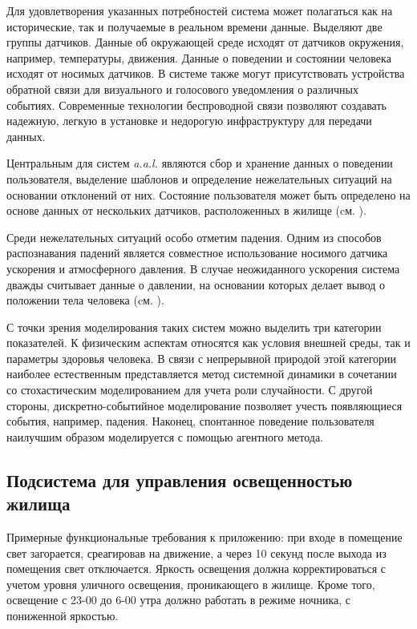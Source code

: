 Для удовлетворения указанных потребностей система может полагаться как на исторические, так и получаемые в реальном времени данные. Выделяют две группы датчиков. Данные об окружающей среде исходят от датчиков окружения, например, температуры, движения. Данные о поведении и состоянии человека исходят от носимых датчиков. В системе также могут присутствовать устройства обратной связи для визуального и голосового уведомления о различных событиях. Современные технологии беспроводной связи позволяют создавать надежную, легкую в установке и недорогую инфраструктуру для передачи данных.

Центральным для систем \textit{a.a.l.} являются сбор и хранение данных о поведении пользователя, выделение шаблонов и определение нежелательных ситуаций на основании отклонений от них. Состояние пользователя может быть определено на основе данных от нескольких датчиков, расположенных в жилище (cм. ).

Среди нежелательных ситуаций особо отметим падения. Одним из способов распознавания падений является совместное использование носимого датчика ускорения и атмосферного давления. В случае неожиданного ускорения система дважды считывает данные о давлении, на основании которых делает вывод о положении тела человека (cм. ).

С точки зрения моделирования таких систем можно выделить три категории показателей. К физическим аспектам относятся как условия внешней среды, так и параметры здоровья человека. В связи с непрерывной природой этой категории наиболее естественным представляется метод системной динамики в сочетании со стохастическим моделированием для учета роли случайности. С другой стороны, дискретно-событийное моделирование позволяет учесть появляющиеся события, например, падения. Наконец, спонтанное поведение пользователя наилучшим образом моделируется с помощью агентного метода.

\subsection{Подсистема для управления освещенностью жилища}
\label{sec_SH_ligth_building_control_subsystem}

Примерные функциональные требования к приложению: при входе в помещение свет загорается, среагировав на движение, а через 10 секунд после выхода из помещения свет отключается. Яркость освещения должна корректироваться с учетом уровня уличного освещения, проникающего в жилище. Кроме того, освещение с 23-00 до 6-00 утра должно работать в режиме ночника, с пониженной яркостью.

